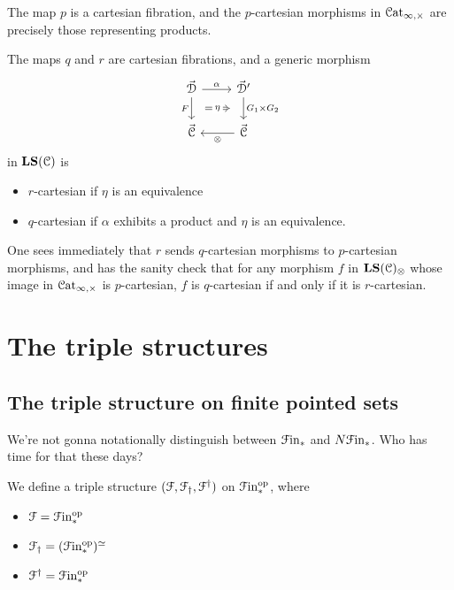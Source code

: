 \documentclass[main.tex]{subfiles}
\begin{document}
\begin{proposition}
  The map $p$ is a cartesian fibration, and the $p$-cartesian morphisms in $\mathcal{C}\mathrm{at}_{\infty,\times}$ are precisely those representing products.
\end{proposition}

\begin{proposition}
  The maps $q$ and $r$ are cartesian fibrations, and a generic morphism
  \begin{equation*}
    \begin{tikzcd}
      \vec{\category{D}}
      \arrow[r, "\alpha"]
      \arrow[d, ""{name=L, right}, "F"{left}]
      & \vec{\category{D}}'
      \arrow[d, ""{name=R, left}, "G_{1} \times G_{2}"{right}]
      \\
      \vec{\category{C}}
      & \vec{\category{C}}
      \arrow[l, "\otimes"]
      \arrow[Rightarrow, from=L, to=R, shorten=1.5ex, "\eta"{description}]
    \end{tikzcd}
  \end{equation*}
  in $\mathbf{LS}(\mathcal{C})$ is
  \begin{itemize}
    \item $r$-cartesian if $\eta$ is an equivalence

    \item $q$-cartesian if $\alpha$ exhibits a product and $\eta$ is an equivalence.
  \end{itemize}
\end{proposition}
One sees immediately that $r$ sends $q$-cartesian morphisms to $p$-cartesian morphisms, and has the sanity check that for any morphism $f$ in $\mathbf{LS}(\mathcal{C})_{\otimes}$ whose image in $\mathcal{C}\mathrm{at}_{\infty,\times}$ is $p$-cartesian, $f$ is $q$-cartesian if and only if it is $r$-cartesian.

\section{The triple structures}
\label{sec:the_triple_structures}

\subsection{The triple structure on finite pointed sets}
\label{ssc:the_triple_structure_on_finite_pointed_sets}

We're not gonna notationally distinguish between $\mathcal{F}\mathrm{in}_{*}$ and $N\mathcal{F}\mathrm{in}_{*}$. Who has time for that these days?

We define a triple structure $(\mathcal{F}, \mathcal{F}_{\dagger}, \mathcal{F}^{\dagger})$ on $\mathcal{F}\mathrm{in}_{*}^{\mathrm{op}}$, where
\begin{itemize}
  \item $\mathcal{F} = \mathcal{F}\mathrm{in}_{*}^{\mathrm{op}}$

  \item $\mathcal{F}_{\dagger} = (\mathcal{F}\mathrm{in}_{*}^{\mathrm{op}})^{\simeq}$

  \item $\mathcal{F}^{\dagger} = \mathcal{F}\mathrm{in}_{*}^{\mathrm{op}}$
\end{itemize}
\end{document}

